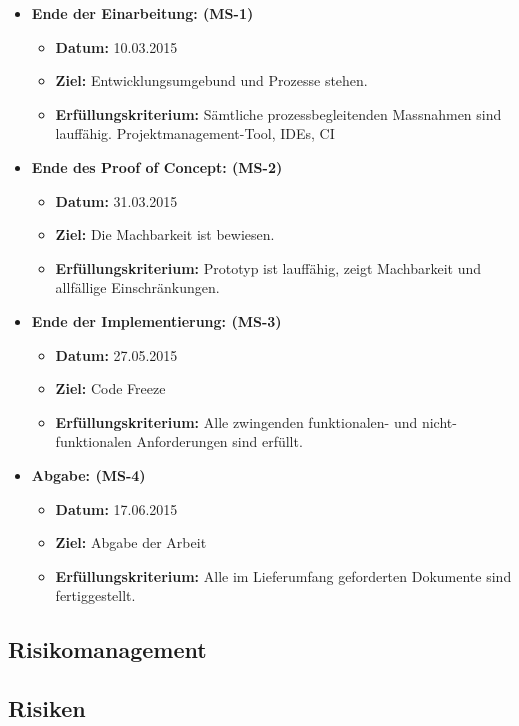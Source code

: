 \begin{itemize}
	\item{\textbf{Ende der Einarbeitung: (MS-1)} 
		\begin{itemize}
			\item{\textbf{Datum:} 10.03.2015}
			\item{\textbf{Ziel:} Entwicklungsumgebund und Prozesse stehen.}
			\item{\textbf{Erfüllungskriterium:} Sämtliche prozessbegleitenden Massnahmen sind lauffähig. Projektmanagement-Tool, IDEs, CI}
		\end{itemize}
	}
	
	\item{\textbf{Ende des Proof of Concept: (MS-2)} 
		\begin{itemize}
			\item{\textbf{Datum:} 31.03.2015}
			\item{\textbf{Ziel:} Die Machbarkeit ist bewiesen.}
			\item{\textbf{Erfüllungskriterium:} Prototyp ist lauffähig, zeigt Machbarkeit und allfällige Einschränkungen.}
		\end{itemize}
	}
	
	\item{\textbf{Ende der Implementierung: (MS-3)} 
		\begin{itemize}
			\item{\textbf{Datum:} 27.05.2015}
			\item{\textbf{Ziel:} Code Freeze}
			\item{\textbf{Erfüllungskriterium:} Alle zwingenden funktionalen- und nicht-funktionalen Anforderungen sind erfüllt.}
		\end{itemize}
	}	
	\item{\textbf{Abgabe: (MS-4)} 
			\begin{itemize}
				\item{\textbf{Datum:} 17.06.2015}
				\item{\textbf{Ziel:} Abgabe der Arbeit}
				\item{\textbf{Erfüllungskriterium:} Alle im Lieferumfang geforderten Dokumente sind fertiggestellt.}
			\end{itemize}
	}
	
\end{itemize}

\newpage


\begin{landscape}
\section{Risikomanagement}
\subsection{Risiken}
\end{landscape}
